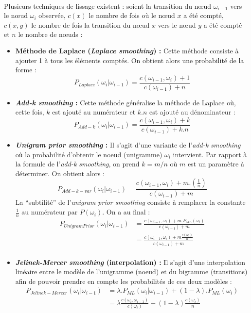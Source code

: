 \documentclass[a4paper,titlepage]{report}
\begin{document}
\paragraph{}
Plusieurs techniques de lissage existent : soient la transition du nœud $\omega_{i-1}$ vers le nœud $\omega_i$ observée, $c(x)$ le nombre de fois où le nœud $x$ a été compté, $c(x,y)$ le nombre de fois la transition du nœud $x$ vers le nœud $y$ a été compté et $n$ le nombre de nœuds : \\
\begin{itemize}
	\item \textbf{Méthode de Laplace (\textit{Laplace smoothing}) :} Cette méthode consiste à ajouter 1 à tous les éléments comptés. On obtient alors une probabilité de la forme : 
	\[
		P_{Laplace} (\omega_i | \omega_{i-1}) = \frac{c(\omega_{i-1}, \omega_i) + 1}{c(\omega_{i-1}) + n}
	\]
	\item \textbf{\textit{Add-k smoothing} :} Cette méthode généralise la méthode de Laplace où, cette fois, $k$ est ajouté au numérateur et $k.n$ est ajouté au dénominateur : 
	\[
		P_{Add-k} (\omega_i | \omega_{i-1}) = \frac{c(\omega_{i-1}, \omega_i) + k}{c(\omega_{i-1}) + k.n}
	\]
	\item \textbf{\textit{Unigram prior smoothing} :} Il s'agit d'une variante de l'\textit{add-k smoothing} où la probabilité d'obtenir le noeud (unigramme) $\omega_i$ intervient. Par rapport à la formule de l'\textit{add-k smoothing}, on prend $k = m/n$ où $m$ est un paramètre à déterminer. On obtient alors : 
	\[
		P_{Add-k-var} (\omega_i | \omega_{i-1}) = \frac{c(\omega_{i-1}, \omega_i) + m . \left(\frac{1}{n}\right)}{c(\omega_{i-1}) + m}
	\]
	La ``subtilité'' de l'\textit{unigram prior smoothing} consiste à remplacer la constante $\frac{1}{n}$ au numérateur par $P(\omega_i)$. On a au final : 
	\[
	\begin{aligned}
		P_{UnigramPrior} (\omega_i | \omega_{i-1}) 
			&= \frac{c(\omega_{i-1}, \omega_i) + m . P_{ML}(\omega_i)}{c(\omega_{i-1}) + m}\\
			&= \frac{c(\omega_{i-1}, \omega_i) + m \frac{c(\omega_i)}{n}}{c(\omega_{i-1}) + m}\\
	\end{aligned}
	\]
	\item \textbf{\textit{Jelinek-Mercer smoothing} (interpolation) :} Il s'agit d'une interpolation linéaire entre le modèle de l'unigramme (noeud) et du bigramme (transitions) afin de pouvoir prendre en compte les probabilités de ces deux modèles : 
	\[
	\begin{aligned}
		P_{Jelinek-Mercer} (\omega_i | \omega_{i-1}) 
			&= \lambda . P_{ML}(\omega_i | \omega_{i-1}) + (1 - \lambda) . P_{ML}(\omega_i)\\
			&= \lambda \frac{c(\omega_i, \omega_{i-1})}{c(\omega_i)} + (1 - \lambda) \frac{c(\omega_i)}{n}
	\end{aligned}
	\]	
\end{itemize}
\end{document}
